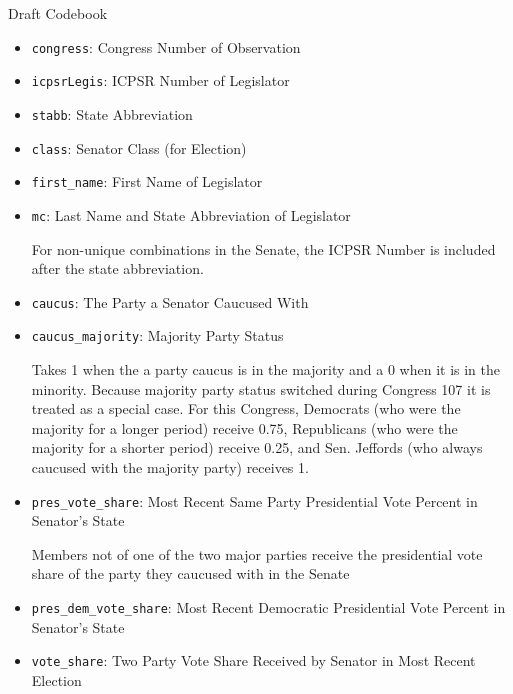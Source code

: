 \documentclass[12pt]{article}
\begin{document}
\begin{center}
\Large Draft Codebook
\end{center}

\begin{itemize}
	\item \verb|congress|: Congress Number of Observation
	
	\item \verb|icpsrLegis|: ICPSR Number of Legislator
	
	\item \verb|stabb|: State Abbreviation
	
	\item \verb|class|: Senator Class (for Election)
	
	\item \verb|first_name|: First Name of Legislator
	
	\item \verb|mc|: Last Name and State Abbreviation of Legislator 
	
	For non-unique combinations in the Senate, the ICPSR Number is included after the state abbreviation.
	
	\item \verb|caucus|: The Party a Senator Caucused With
	
	\item \verb|caucus_majority|: Majority Party Status
	
	Takes 1 when the a party caucus is in the majority and a 0 when it is in the minority. Because majority party status switched during Congress 107 it is treated as a special case. For this Congress, Democrats (who were the majority for a longer period) receive 0.75, Republicans (who were the majority for a shorter period) receive 0.25, and Sen. Jeffords (who always caucused with the majority party) receives 1.
	
	\item \verb|pres_vote_share|: Most Recent Same Party Presidential Vote Percent in Senator's State
	
	Members not of one of the two major parties receive the presidential vote share of the party they caucused with in the Senate
	
	\item \verb|pres_dem_vote_share|: Most Recent Democratic Presidential Vote Percent in Senator's State
	
	\item \verb|vote_share|: Two Party Vote Share Received by Senator in Most Recent Election
	

\end{itemize}
\end{document}
